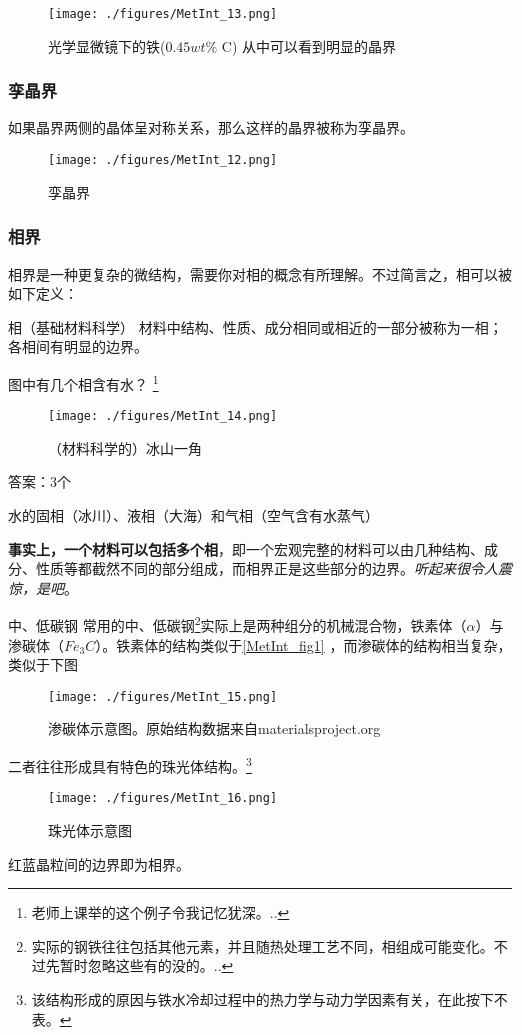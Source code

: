 \begin{figure}[ht]
\centering
\texttt{[image: ./figures/MetInt\_13.png]}
\caption{光学显微镜下的铁($0.45 wt\%$ C) 从中可以看到明显的晶界} \label{MetInt_fig13}
\end{figure}

\subsubsection{孪晶界}
如果晶界两侧的晶体呈对称关系，那么这样的晶界被称为孪晶界。
\begin{figure}[ht]
\centering
\texttt{[image: ./figures/MetInt\_12.png]}
\caption{孪晶界} \label{MetInt_fig12}
\end{figure}

\subsubsection{相界}
相界是一种更复杂的微结构，需要你对相的概念有所理解。不过简言之，相可以被如下定义：
\begin{definition}{相（基础材料科学）}
材料中结构、性质、成分相同或相近的一部分被称为一相；各相间有明显的边界。
\end{definition}

\begin{example}{图中有几个相含有水？}
\footnote{老师上课举的这个例子令我记忆犹深。..}
\begin{figure}[ht]
\centering
\texttt{[image: ./figures/MetInt\_14.png]}
\caption{（材料科学的）冰山一角} \label{MetInt_fig14}
\end{figure}
答案：3个

水的固相（冰川）、液相（大海）和气相（空气含有水蒸气）
\end{example}

\textbf{事实上，一个材料可以包括多个相}，即一个宏观完整的材料可以由几种结构、成分、性质等都截然不同的部分组成，而相界正是这些部分的边界。\textsl{听起来很令人震惊，是吧}。

\begin{example}{中、低碳钢}
常用的中、低碳钢\footnote{实际的钢铁往往包括其他元素，并且随热处理工艺不同，相组成可能变化。不过先暂时忽略这些有的没的。..}实际上是两种组分的机械混合物，铁素体（$\alpha$）与渗碳体（$Fe_3C$）。铁素体的结构类似于\autoref{MetInt_fig1} ，而渗碳体的结构相当复杂，类似于下图
\begin{figure}[ht]
\centering
\texttt{[image: ./figures/MetInt\_15.png]}
\caption{渗碳体示意图。原始结构数据来自materialsproject.org} \label{MetInt_fig15}
\end{figure}
二者往往形成具有特色的珠光体结构。\footnote{该结构形成的原因与铁水冷却过程中的热力学与动力学因素有关，在此按下不表。}
\begin{figure}[ht]
\centering
\texttt{[image: ./figures/MetInt\_16.png]}
\caption{珠光体示意图} \label{MetInt_fig16}
\end{figure}
红蓝晶粒间的边界即为相界。
\end{example}

